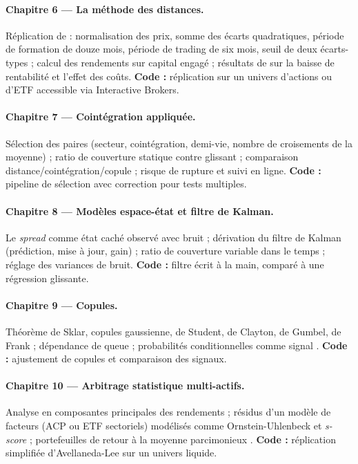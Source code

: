 \documentclass[11pt,a4paper]{article}
\begin{document}
\paragraph{Chapitre 6 — La méthode des distances.}
Réplication de \citet{gatev2006} : normalisation des prix, somme des écarts quadratiques, période de formation de douze mois, période de trading de six mois, seuil de deux écarts-types ; calcul des rendements sur capital engagé ; résultats de \citet{dofaff2010,dofaff2012} sur la baisse de rentabilité et l'effet des coûts. \textbf{Code :} réplication sur un univers d'actions ou d'ETF accessible via Interactive Brokers.

\paragraph{Chapitre 7 — Cointégration appliquée.}
Sélection des paires (secteur, cointégration, demi-vie, nombre de croisements de la moyenne) \citep{vidyamurthy2004,huck2009} ; ratio de couverture statique contre glissant ; comparaison distance/cointégration/copule \citep{rad2016} ; risque de rupture et suivi en ligne. \textbf{Code :} pipeline de sélection avec correction pour tests multiples.

\paragraph{Chapitre 8 — Modèles espace-état et filtre de Kalman.}
Le \emph{spread} comme état caché observé avec bruit \citep{elliott2005} ; dérivation du filtre de Kalman (prédiction, mise à jour, gain) ; ratio de couverture variable dans le temps ; réglage des variances de bruit. \textbf{Code :} filtre écrit à la main, comparé à une régression glissante.

\paragraph{Chapitre 9 — Copules.}
Théorème de Sklar, copules gaussienne, de Student, de Clayton, de Gumbel, de Frank ; dépendance de queue ; probabilités conditionnelles comme signal \citep{liewwu2013,xie2016}. \textbf{Code :} ajustement de copules et comparaison des signaux.

\paragraph{Chapitre 10 — Arbitrage statistique multi-actifs.}
Analyse en composantes principales des rendements ; résidus d'un modèle de facteurs (ACP ou ETF sectoriels) modélisés comme Ornstein-Uhlenbeck et \emph{s-score} \citep{avellaneda2010} ; portefeuilles de retour à la moyenne parcimonieux \citep{boxtiao1977,daspremont2011}. \textbf{Code :} réplication simplifiée d'Avellaneda-Lee sur un univers liquide.
\end{document}
